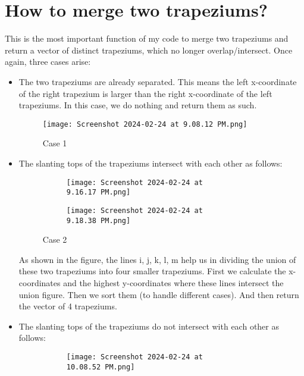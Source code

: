 \documentclass[a4paper,12pt]{article}
\begin{document}
\section{How to merge two trapeziums?}
This is the most important function of my code to merge two trapeziums and return a vector of distinct trapeziums, which
no longer overlap/intersect. Once again, three cases arise:
\begin{itemize}
    \item The two trapeziums are already separated. This means the left x-coordinate of the right trapezium is larger than the right x-coordinate of the left trapeziums. In this case, we do nothing and return them as such.
    \begin{figure}[h]
        \centering
        \texttt{[image: Screenshot 2024-02-24 at 9.08.12 PM.png]}
        \caption{Case 1}
      \end{figure}
    \item The slanting tops of the trapeziums intersect with each other as follows:
    \begin{figure}[h]
        \centering
        \begin{subfigure}{0.45\linewidth}
            \centering
            \texttt{[image: Screenshot 2024-02-24 at 9.16.17 PM.png]}
        \end{subfigure}
        \hfill
        \begin{subfigure}{0.45\linewidth}
            \centering
            \texttt{[image: Screenshot 2024-02-24 at 9.18.38 PM.png]}
        \end{subfigure}
        \caption{Case 2}
    \end{figure} 
      As shown in the figure, the lines i, j, k, l, m help us in dividing the union of these two trapeziums into four smaller trapeziums.
      First we calculate the x-coordinates and the highest y-coordinates where these lines intersect the union figure. Then we sort them (to handle different cases). And then return the vector of 4 trapeziums.
      \item The slanting tops of the trapeziums do not intersect with each other as follows:
      \begin{figure}[h]
        \centering
        \begin{subfigure}{0.45\linewidth}
            \centering
            \texttt{[image: Screenshot 2024-02-24 at 10.08.52 PM.png]}
        \end{subfigure}
        \hfill

\end{figure}
\end{itemize}
\end{document}
